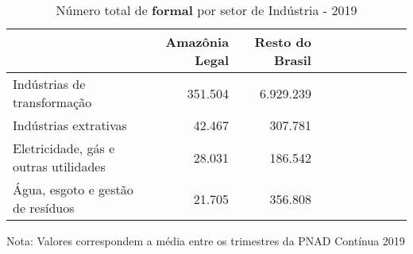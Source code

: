 \begin{table}[H]
\centering
\label{\_retrato\_emprego\_setor\_spap\_industria\_table\_n\_de\_formal}
\begin{threeparttable}
\caption{Número total de \textbf{formal} por setor de Indústria - 2019}
\begin{tabular}{l*{3}{rrr}}
\midrule \midrule
                    &Amazônia Legal&Resto do Brasil\\
\midrule
Indústrias de transformação&     351.504&   6.929.239\\
Indústrias extrativas&      42.467&     307.781\\
Eletricidade, gás e outras utilidades&      28.031&     186.542\\
Água, esgoto e gestão de resíduos&      21.705&     356.808\\
\bottomrule
\end{tabular}
\begin{tablenotes}
\scriptsize{Nota: Valores correspondem a média entre os trimestres da PNAD Contínua 2019}
\end{tablenotes}
\end{threeparttable}
\end{table}
